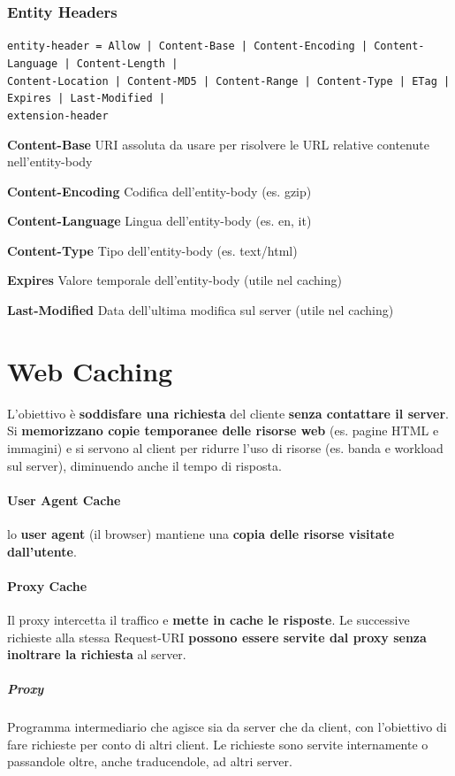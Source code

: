 \documentclass[10pt]{article}
\begin{document}
\subsubsection{Entity Headers}
\texttt{entity-header = Allow | Content-Base | Content-Encoding | Content-Language | Content-Length |\\Content-Location | Content-MD5 | Content-Range | Content-Type | ETag | Expires | Last-Modified |\\extension-header}
\begin{list}{}{}
\item \textbf{Content-Base} URI assoluta da usare per risolvere le URL relative contenute nell'entity-body
\item \textbf{Content-Encoding} Codifica dell'entity-body (es. gzip)
\item \textbf{Content-Language} Lingua dell'entity-body (es. en, it)
\item \textbf{Content-Type} Tipo dell'entity-body (es. text/html)
\item \textbf{Expires} Valore temporale dell'entity-body (utile nel caching)
\item \textbf{Last-Modified} Data dell'ultima modifica sul server (utile nel caching)
\end{list}
\section{Web Caching}
L'obiettivo è \textbf{soddisfare una richiesta} del cliente \textbf{senza contattare il server}. Si \textbf{memorizzano copie temporanee delle risorse web} (es. pagine HTML e immagini) e si servono al client per ridurre l'uso di risorse (es. banda e workload sul server), diminuendo anche il tempo di risposta.
\paragraph{User Agent Cache} lo \textbf{user agent} (il browser) mantiene una \textbf{copia delle risorse visitate dall'utente}.
\paragraph{Proxy Cache} Il proxy intercetta il traffico e \textbf{mette in cache le risposte}. Le successive richieste alla stessa Request-URI \textbf{possono essere servite dal proxy senza inoltrare la richiesta} al server.
\subparagraph{Proxy} Programma intermediario che agisce sia da server che da client, con l'obiettivo di fare richieste per conto di altri client. Le richieste sono servite internamente o passandole oltre, anche traducendole, ad altri server.
\end{document}
